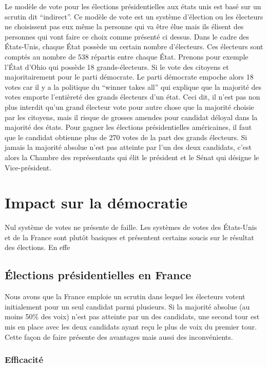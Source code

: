 \documentclass[11pt,a4paper]{report}
\begin{document}
Le modèle de vote pour les élections présidentielles aux états unis est basé sur un scrutin dit “indirect”.
Ce modèle de vote est un système d'élection ou les électeurs ne choisissent pas eux même la personne qui va être élue mais ils élisent des personnes qui vont faire ce choix comme présenté ci dessus.
Dans le cadre des États-Unis, chaque État possède un certain nombre d'électeurs.
Ces électeurs sont comptés au nombre de 538 répartis entre chaque État.
Prenons pour exemple l'État d'Ohio qui possède 18 grands-électeurs.
Si le vote des citoyens et majoritairement pour le parti démocrate.
Le parti démocrate empoche alors 18 votes car il y a la politique du “winner takes all” qui explique que la majorité des votes emporte l'entièreté des grands électeurs d’un état.
Ceci dit, il n’est pas non plus interdit qu’un grand électeur vote pour autre chose que la majorité choisie par les citoyens, mais il risque de grosses amendes pour candidat déloyal dans la majorité des états.
Pour gagner les élections présidentielles américaines, il faut que le candidat obtienne plus de 270 votes de la part des grands électeurs.
Si jamais la majorité absolue n’est pas atteinte par l’un des deux candidats, c’est alors la Chambre des représentants qui élit le président et le Sénat qui désigne le Vice-président.
\nocite{wiki:electday}
\nocite{wiki:elecus}
\nocite{wiki:eleccoll}

\chapter{Impact sur la démocratie}

Nul système de votes ne présente de faille.
Les systèmes de votes des États-Unis et de la France sont plutôt basiques et présentent certains soucis sur le résultat des élections.
En effe

\section{Élections présidentielles en France}
Nous avons que la France emploie un scrutin dans lequel les électeurs votent initialement pour un seul candidat parmi plusieurs.
Si la majorité absolue (au moins 50\% des voix) n’est pas atteinte par un des candidats, une second tour est mis en place avec les deux candidats ayant reçu le plus de voix du premier tour.\nocite{wiki:scrutinuni2tours}
Cette façon de faire présente des avantages mais aussi des inconvénients.

\subsection{Efficacité}
\end{document}
